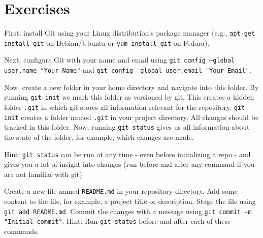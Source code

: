 \documentclass{dcbl/challenge}
\begin{document}
\section*{Exercises}
\begin{aufgabe}
    First, install Git using your Linux distribution's package manager (e.g., \texttt{apt-get install git} on Debian/Ubuntu or \texttt{yum install git} on Fedora).
    
    Next, configure Git with your name and email using \texttt{git config --global user.name "Your Name"} and \texttt{git config --global user.email "Your Email"}.

    Now, create a new folder in your home directory and navigate into this folder.
    By running \texttt{git init} we mark this folder as versioned by git. This creates a hidden folder \texttt{.git} in which git stores all information relevant for the repository. 
    \texttt{git init} creates a folder named \texttt{.git} in your project directory.
    All changes should be tracked in this folder.
    Now, running \texttt{git status} gives us all information about the state of the folder, for example, which changes are made.
    
    Hint: \texttt{git status} can be run at any time - even before initializing a repo - and gives you a lot of insight into changes (run before and after any command if you are not familiar with git) 
\end{aufgabe}

\begin{aufgabe}        
    Create a new file named \texttt{README.md} in your repository directory.
    Add some content to the file, for example, a project title or description.
    Stage the file using \texttt{git add README.md}.
    Commit the changes with a message using \texttt{git commit -m "Initial commit"}.
    Hint: Run \texttt{git status} before and after each of these commands.
\end{aufgabe}
\end{document}
